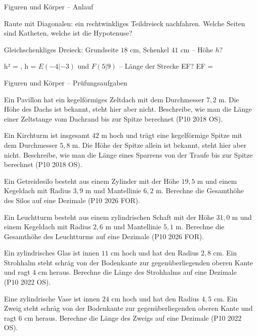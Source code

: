 \begin{aufgabe}{Figuren und Körper – Anlauf}
\begin{teile}
\teil Raute mit Diagonalen: ein rechtwinkliges Teildreieck nachfahren. Welche Seiten sind Katheten, welche ist die Hypotenuse?

\teil Gleichschenkliges Dreieck: Grundseite $18$ cm, Schenkel $41$ cm – Höhe $h$?

h² = \leerfeld , h = \leerfeld[cm]
\teil $E(-4 | -3)$ und $F(5 | 9)$ – Länge der Strecke EF? EF = \leerfeld
\end{teile}
\end{aufgabe}

\begin{aufgabe}{Figuren und Körper – Prüfungsaufgaben}
\begin{teile}
\steil Ein Pavillon hat ein kegelförmiges Zeltdach mit dem Durchmesser $7{,}2$ m. Die Höhe des Dachs ist bekannt, steht hier aber nicht. Beschreibe, wie man die Länge einer Zeltstange vom Dachrand bis zur Spitze berechnet \hfill (P10 2018 OS).

\steil Ein Kirchturm ist insgesamt $42$ m hoch und trägt eine kegelförmige Spitze mit dem Durchmesser $5{,}8$ m. Die Höhe der Spitze allein ist bekannt, steht hier aber nicht. Beschreibe, wie man die Länge eines Sparrens von der Traufe bis zur Spitze berechnet \hfill (P10 2018 OS).

\teil Ein Getreidesilo besteht aus einem Zylinder mit der Höhe $19{,}5$ m und einem Kegeldach mit Radius $3{,}9$ m und Mantellinie $6{,}2$ m. Berechne die Gesamthöhe des Silos auf eine Dezimale \hfill (P10 2026 FOR).

\leerfeld[m]
\teil Ein Leuchtturm besteht aus einem zylindrischen Schaft mit der Höhe $31{,}0$ m und einem Kegeldach mit Radius $2{,}6$ m und Mantellinie $5{,}1$ m. Berechne die Gesamthöhe des Leuchtturms auf eine Dezimale \hfill (P10 2026 FOR).

\leerfeld[m]
\steil Ein zylindrisches Glas ist innen $11$ cm hoch und hat den Radius $2{,}8$ cm. Ein Strohhalm steht schräg von der Bodenkante zur gegenüberliegenden oberen Kante und ragt $4$ cm heraus. Berechne die Länge des Strohhalms auf eine Dezimale \hfill (P10 2022 OS).

\leerfeld[cm]
\steil Eine zylindrische Vase ist innen $24$ cm hoch und hat den Radius $4{,}5$ cm. Ein Zweig steht schräg von der Bodenkante zur gegenüberliegenden oberen Kante und ragt $6$ cm heraus. Berechne die Länge des Zweigs auf eine Dezimale \hfill (P10 2022 OS).

\leerfeld[cm]
\end{teile}
\end{aufgabe}

